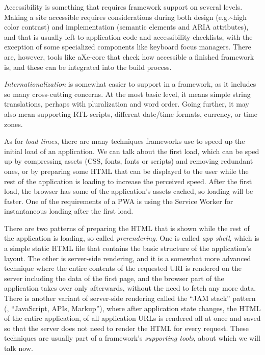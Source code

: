 \documentclass[english,odsaz]{fitthesis}
\begin{document}
Accessibility is something that requires framework support on several
levels. Making a site accessible requires considerations during both design
(e.g.\textasciitilde{}high color contrast) and implementation (semantic elements and ARIA
attributes), and that is usually left to application code and accessibility
checklists, with the exception of some specialized components like keyboard
focus managers. There are, however, tools like aXe-core that check how
accessible a finished framework is, and these can be integrated into the build
process.

\emph{Internationalization} is somewhat easier to support in a framework, as it
includes so many cross-cutting concerns. At the most basic level, it means
simple string translations, perhaps with pluralization and word order. Going
further, it may also mean supporting RTL scripts, different date/time formats,
currency, or time zones.

As for \emph{load times}, there are many techniques frameworks use to speed up the
initial load of an application. We can talk about the first load, which can be
sped up by compressing assets (CSS, fonts, fonts or scripts) and removing
redundant ones, or by preparing some HTML that can be displayed to the user
while the rest of the application is loading to increase the perceived
speed. After the first load, the browser has some of the application's assets
cached, so loading will be faster. One of the requirements of a PWA is using the
Service Worker for instantaneous loading after the first load.

There are two patterns of preparing the HTML that is shown while the rest of the
application is loading, so called \emph{prerendering}. One is called \emph{app shell}, which
is a simple static HTML file that contains the basic structure of the
application's layout. The other is server-side rendering, and it is a somewhat
more advanced technique where the entire contents of the requested URI is
rendered on the server including the data of the first page, and the browser
part of the application takes over only afterwards, without the need to fetch
any more data. There is another variant of server-side rendering called the ``JAM
stack'' pattern (\cite{jamstack}, ``JavaScript, APIs, Markup''), where after application state changes, the HTML of
the entire application, of all application URLs is rendered all at once and
saved so that the server does not need to render the HTML for every
request. These techniques are usually part of a framework's \emph{supporting tools},
about which we will talk now.
\end{document}
